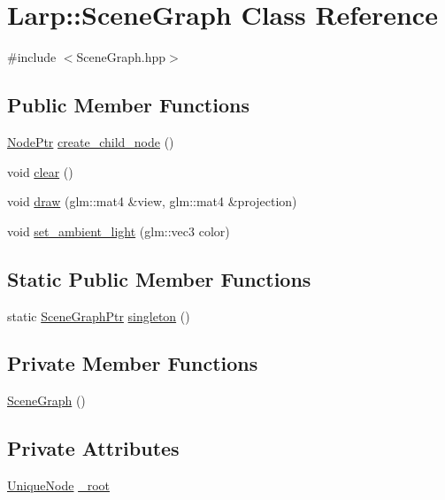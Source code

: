\hypertarget{classLarp_1_1SceneGraph}{\section{Larp\-:\-:Scene\-Graph Class Reference}
\label{classLarp_1_1SceneGraph}
}


{\ttfamily \#include $<$Scene\-Graph.\-hpp$>$}

\subsection*{Public Member Functions}
\begin{DoxyCompactItemize}
\item 
\hyperlink{namespaceLarp_a171c1dc8b70cfb441b15d7386780db23}{Node\-Ptr} \hyperlink{classLarp_1_1SceneGraph_abd2f09bea39c3e15a4c5cd2d9ee7e6a3}{create\-\_\-child\-\_\-node} ()
\item 
void \hyperlink{classLarp_1_1SceneGraph_a21ef2624b18a0e9a0df2ee52db762447}{clear} ()
\item 
void \hyperlink{classLarp_1_1SceneGraph_a8113f5f330d20c966c5f2403e1e6386b}{draw} (glm\-::mat4 \&view, glm\-::mat4 \&projection)
\item 
void \hyperlink{classLarp_1_1SceneGraph_a3b99e07a52de26cb627e4f6e908a2299}{set\-\_\-ambient\-\_\-light} (glm\-::vec3 color)
\end{DoxyCompactItemize}
\subsection*{Static Public Member Functions}
\begin{DoxyCompactItemize}
\item 
static \hyperlink{namespaceLarp_acf02d81e4b52238dcd17cb6249eadadc}{Scene\-Graph\-Ptr} \hyperlink{classLarp_1_1SceneGraph_a569504ef263e392f9376bd50bb09a912}{singleton} ()
\end{DoxyCompactItemize}
\subsection*{Private Member Functions}
\begin{DoxyCompactItemize}
\item 
\hyperlink{classLarp_1_1SceneGraph_a256e0ff974a0f905a848a99f18b7ffc4}{Scene\-Graph} ()
\end{DoxyCompactItemize}
\subsection*{Private Attributes}
\begin{DoxyCompactItemize}
\item 
\hyperlink{namespaceLarp_ad95a88bc34f8c78cefd64c9bbeb94a58}{Unique\-Node} \hyperlink{classLarp_1_1SceneGraph_a88a58f51a6937827ae1d814d0b44a0d7}{\-\_\-root}
\end{DoxyCompactItemize}
